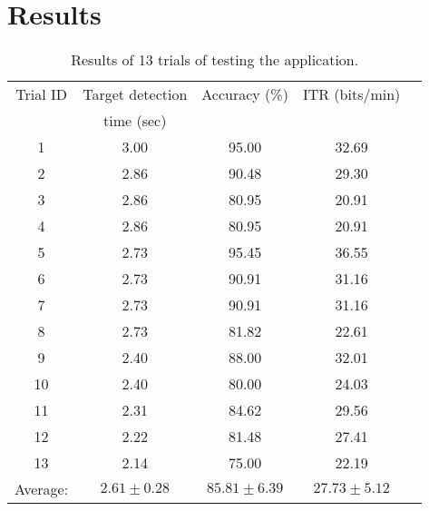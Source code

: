 
\chapter{Results}

\begin{table}[h]
	\centering
	\begin{tabular}{|c|c|c|c|c|}\hline
Trial ID	& Target detection 	& Accuracy (\%)		& ITR (bits/min)	& \\
			& time (sec)		&					&					& \\\hline
1			& 3.00				& 95.00				& 32.69				& \\\hline
2			& 2.86				& 90.48				& 29.30				& \\\hline
3			& 2.86				& 80.95				& 20.91				& \\\hline
4			& 2.86				& 80.95				& 20.91				& \\\hline
5			& 2.73				& 95.45 			& 36.55				& \\\hline
6			& 2.73				& 90.91				& 31.16				& \\\hline
7			& 2.73				& 90.91				& 31.16				& \\\hline
8 			& 2.73	 			& 81.82 			& 22.61 			& \\\hline
9 			& 2.40 				& 88.00 			& 32.01 			& \\\hline
10 			& 2.40 				& 80.00 			& 24.03 			& \\\hline
11 			& 2.31				& 84.62 			& 29.56 			& \\\hline
12 			& 2.22 				& 81.48 			& 27.41 			& \\\hline
13 			& 2.14 				& 75.00				& 22.19 			& \\\hline
Average:	& $2.61\pm 0.28$ 	& $85.81\pm 6.39$	& $27.73\pm 5.12$	& \\\hline
	\end{tabular}
	\caption{Results of 13 trials of testing the application.}
	\label{tab:results}
\end{table}
